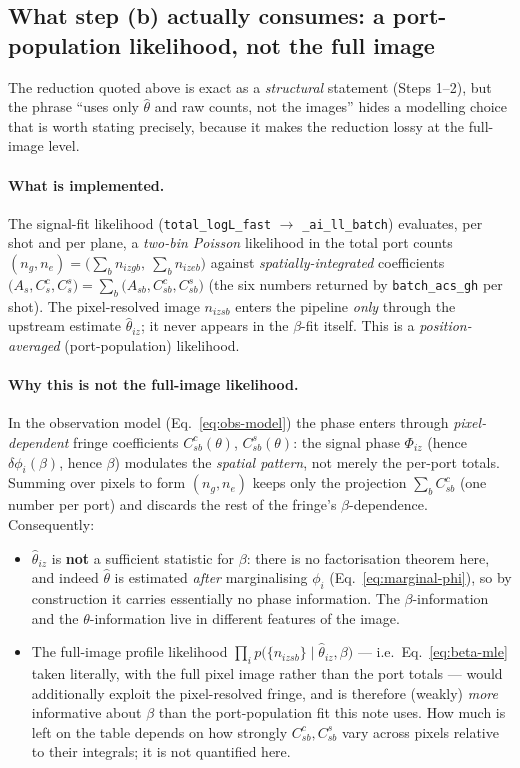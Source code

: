 \documentclass[11pt,a4paper]{article}
\newcommand{\code}[1]{\texttt{#1}}
\begin{document}
\subsection{What step (b) actually consumes: a port-population likelihood,
not the full image}
\label{sec:whatimplemented}

The reduction quoted above is exact as a \emph{structural} statement (Steps
1--2), but the phrase ``uses only $\hat\theta$ and raw counts, not the
images'' hides a modelling choice that is worth stating precisely, because
it makes the reduction lossy at the full-image level.

\paragraph{What is implemented.} The signal-fit likelihood
(\code{total\_logL\_fast} $\to$ \code{\_ai\_ll\_batch}) evaluates, per shot
and per plane, a \emph{two-bin Poisson} likelihood in the total port counts
$(n_g,n_e)=\bigl(\sum_b n_{izgb},\ \sum_b n_{izeb}\bigr)$ against
\emph{spatially-integrated} coefficients
$\bigl(A_s,C^c_s,C^s_s\bigr)=\sum_b\bigl(A_{sb},C^c_{sb},C^s_{sb}\bigr)$
(the six numbers returned by \code{batch\_acs\_gh} per shot). The
pixel-resolved image $n_{izsb}$ enters the pipeline \emph{only} through the
upstream estimate $\hat\theta_{iz}$; it never appears in the $\beta$-fit
itself. This is a \emph{position-averaged} (port-population) likelihood.

\paragraph{Why this is not the full-image likelihood.} In the observation
model (Eq.~\ref{eq:obs-model}) the phase enters through
\emph{pixel-dependent} fringe coefficients $C^c_{sb}(\theta)$,
$C^s_{sb}(\theta)$: the signal phase $\Phi_{iz}$ (hence $\delta\phi_i(\beta)$,
hence $\beta$) modulates the \emph{spatial pattern}, not merely the per-port
totals. Summing over pixels to form $(n_g,n_e)$ keeps only the projection
$\sum_b C^c_{sb}$ (one number per port) and discards the rest of the fringe's
$\beta$-dependence. Consequently:
\begin{itemize}
  \item $\hat\theta_{iz}$ is \textbf{not} a sufficient statistic for
    $\beta$: there is no factorisation theorem here, and indeed $\hat\theta$
    is estimated \emph{after} marginalising $\phi_i$
    (Eq.~\ref{eq:marginal-phi}), so by construction it carries essentially
    no phase information. The $\beta$-information and the $\theta$-information
    live in different features of the image.
  \item The full-image profile likelihood
    $\prod_i p\bigl(\{n_{izsb}\}\mid\hat\theta_{iz},\beta\bigr)$ ---
    i.e.\ Eq.~\ref{eq:beta-mle} taken literally, with the full pixel image
    rather than the port totals --- would additionally exploit the
    pixel-resolved fringe, and is therefore (weakly) \emph{more} informative
    about $\beta$ than the port-population fit this note uses. How much is
    left on the table depends on how strongly $C^c_{sb},C^s_{sb}$ vary across
    pixels relative to their integrals; it is not quantified here.
\end{itemize}
\end{document}
